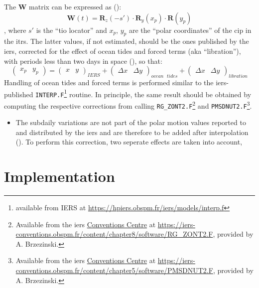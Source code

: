 The $\bm{W}$ matrix can be expressed as (\cite{iers2010}):
\begin{equation}
    \bm{W}(t) = \bm{R}_z(-s') \cdot \bm{R}_y(x_p) \cdot \bm{R}(y_p)
    \label{eq:iers1053}
\end{equation},
where $s'$ is the ``\gls{tio} locator'' and $x_p$, $y_p$ are the 
``polar coordinates'' of the \gls{cip} in the \gls{itrs}. The latter values, 
if not estimated, should be the ones published by the \gls{iers}, corrected for 
the effect of ocean tides and forced terms (aka ``libration''), with periods 
less than two days in space (\cite{iers2010}), so that:
\begin{equation}
    \begin{pmatrix} x_p & y_p \end{pmatrix} = 
    \begin{pmatrix} x & y \end{pmatrix}_{IERS} + 
    \begin{pmatrix} \Delta x & \Delta y \end{pmatrix}_{ocean\text{ }tides} + 
    \begin{pmatrix} \Delta x & \Delta y \end{pmatrix}_{libration} 
\end{equation}
Handling of ocean tides and forced terms is performed similar to the \gls{iers}-
published \texttt{INTERP.F}\footnote{available from IERS at \url{https://hpiers.obspm.fr/iers/models/interp.f}} routine. 
In principle, the same result should be obtained by computing the respective 
corrections from calling \texttt{RG\_ZONT2.F}\footnote{Available from the \gls{iers} \href{https://iers-conventions.obspm.fr/}{Conventions Centre} at \url{https://iers-conventions.obspm.fr/content/chapter8/software/RG_ZONT2.F}, provided by A. Brzezinski.} 
and \texttt{PMSDNUT2.F}\footnote{Available from the \gls{iers} \href{https://iers-conventions.obspm.fr/}{Conventions Centre} at \url{https://iers-conventions.obspm.fr/content/chapter5/software/PMSDNUT2.F}, provided by A. Brzezinski.}.

\begin{itemize}
    \item The subdaily variations are not part of the polar motion values 
    reported to and distributed by the \gls{iers} and are therefore to be 
    added after interpolation (\cite{iers2010}). To perform this correction, 
    two seperate effects are taken into account,
\end{itemize}

\section{Implementation}
\label{eop-implementation}

